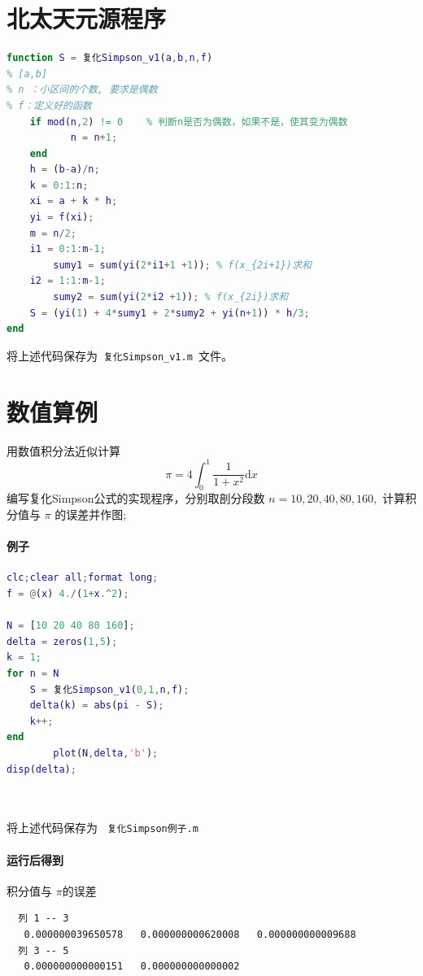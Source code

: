 \documentclass{xtupaper}
\begin{document}
\newpage
\section{北太天元源程序}
\begin{lstlisting}[language=matlab]
function S = 复化Simpson_v1(a,b,n,f)
% [a,b]
% n ：小区间的个数, 要求是偶数
% f：定义好的函数
    if mod(n,2) != 0    % 判断n是否为偶数，如果不是，使其变为偶数
    	   n = n+1;
    end
    h = (b-a)/n;
    k = 0:1:n;    
    xi = a + k * h;
    yi = f(xi);
    m = n/2;
    i1 = 0:1:m-1;
        sumy1 = sum(yi(2*i1+1 +1)); % f(x_{2i+1})求和
    i2 = 1:1:m-1;       
        sumy2 = sum(yi(2*i2 +1)); % f(x_{2i})求和
    S = (yi(1) + 4*sumy1 + 2*sumy2 + yi(n+1)) * h/3;
end
\end{lstlisting}
将上述代码保存为\verb| 复化Simpson_v1.m |文件。

\newpage
\section{数值算例}
\begin{example}\label{exmT1} 
用数值积分法近似计算
\[\pi = 4\int_0^1 \frac{1}{1+x^2}\mathrm{d}x\]
编写复化Simpson公式的实现程序，分别取剖分段数 $ n = 10, 20, 40, 80, 160, $ 计算积分值与 $\pi$ 的误差并作图;
\end{example}

\paragraph{例子}

\begin{lstlisting}[language=matlab]
% 复化Simpson求积例子
clc;clear all;format long;
f = @(x) 4./(1+x.^2);

N = [10 20 40 80 160];
delta = zeros(1,5);
k = 1;
for n = N
    S = 复化Simpson_v1(0,1,n,f);
    delta(k) = abs(pi - S);
    k++;
end
    	plot(N,delta,'b');
disp(delta);
    
    
\end{lstlisting}
将上述代码保存为 \verb| 复化Simpson例子.m |

\paragraph{运行后得到}
积分值与 $ \pi $的误差
\begin{verbatim}
  列 1 -- 3
   0.000000039650578   0.000000000620008   0.000000000009688   
  列 3 -- 5
   0.000000000000151   0.000000000000002
\end{verbatim}
\end{document}
